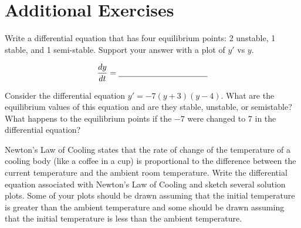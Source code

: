 \newpage\section{Additional Exercises}

\begin{problem}
    Write a differential equation that has four equilibrium points: 2 unstable,
1 stable, and 1 semi-stable.  Support your answer with a plot of
$y'$ vs $y$.

\begin{minipage}{0.5\columnwidth}
\end{minipage}
\begin{minipage}{0.5\columnwidth}
    \[ \frac{dy}{dt} = \underline{\hspace{1.5in}} \]
\end{minipage}
\end{problem}
\solution{
    \[ y' = (y-1)(y-2)(y-3)^2(y-4) \]
}

\begin{problem}
    Consider the differential equation $y' = -7(y+3)(y-4)$.  What are the equilibrium
    values of this equation and are they stable, unstable, or semistable? What happens to
    the equilibrium points if
    the $-7$ were changed to $7$ in the differential equation?
\end{problem}

\begin{problem}
    Newton's Law of Cooling states that the rate of change of the temperature of a cooling
    body (like a coffee in a cup) is proportional to the difference between the current
    temperature and the ambient room temperature.  Write the differential equation
    associated with Newton's Law of Cooling and sketch several solution plots.  Some of
    your plots should be drawn assuming that the initial temperature is greater than the
    ambient temperature and some should be drawn assuming that the initial temperature is
    less than the ambient temperature.
    \begin{center}
        \end{center}
\end{problem}
\solution{
    \[ \frac{dT}{dt} = -k(T-T_{amb}) \]
}


